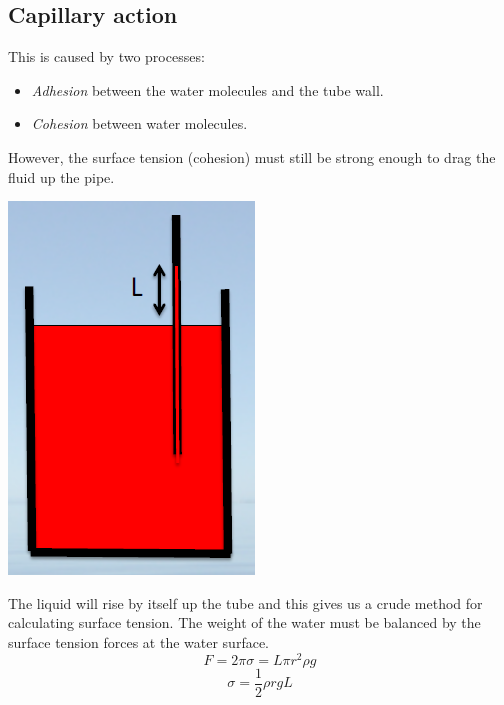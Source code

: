 \documentclass[class=report, crop=false, 12pt,a4paper]{standalone}
\begin{document}
\subsection{Capillary action}
This is caused by two processes:
\begin{itemize}[noitemsep]
  \item \emph{Adhesion} between the water molecules and the tube wall.
  \item \emph{Cohesion} between water molecules.
\end{itemize}
However, the surface tension (cohesion) must still be strong enough to drag the fluid up the pipe.
\begin{center}
  \includegraphics[width = 0.4 \textwidth]{../img/CapillaryAction}
\end{center}
The liquid will rise by itself up the tube and this gives us a crude method for calculating surface tension. The weight of the water must be balanced by the surface tension forces at the water surface.
\begin{equation}
  F = 2\pi \sigma = L\pi r^2 \rho g
\end{equation}
\begin{equation}
  \sigma = \frac{1}{2}\rho r g L
\end{equation}
\end{document}

